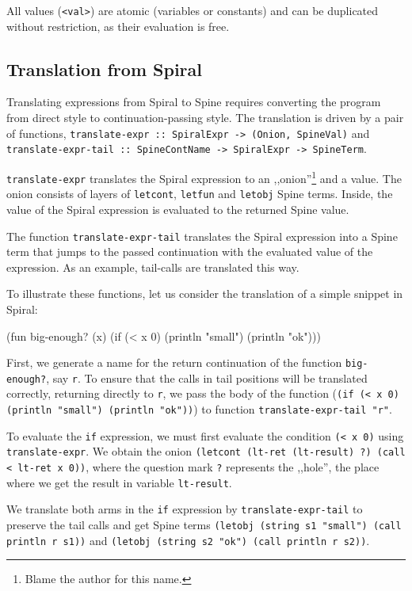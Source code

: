 All values (\texttt{<val>}) are atomic (variables or constants) and can be
duplicated without restriction, as their evaluation is free.

\subsection{Translation from Spiral}

Translating expressions from Spiral to Spine requires converting the program
from direct style to continuation-passing style. The translation is driven by a
pair of functions, \texttt{translate-expr :: SpiralExpr -> (Onion, SpineVal)}
and \texttt{translate-expr-tail :: SpineContName -> SpiralExpr -> SpineTerm}.

\texttt{translate-expr} translates the Spiral expression to an
,,onion''\footnote{Blame the author for this name.} and a value.
The onion consists of layers of \texttt{letcont}, \texttt{letfun} and
\texttt{letobj} Spine terms. Inside, the value of the Spiral expression is
evaluated to the returned Spine value.

The function \texttt{translate-expr-tail} translates the Spiral expression
into a Spine term that jumps to the passed continuation with the evaluated value
of the expression. As an example, tail-calls are translated this way.

To illustrate these functions, let us consider the translation of a simple snippet
in Spiral:

\begin{spiral}
(fun big-enough? (x)
  (if (< x 0)
    (println "small")
    (println "ok")))
\end{spiral}

First, we generate a name for the return continuation of the function
\texttt{big-enough?}, say \texttt{r}. To ensure that the calls in tail positions
will be translated correctly, returning directly to \texttt{r}, we pass the body
of the function (\texttt{(if (< x 0) (println "small") (println "ok"))}) to function
\texttt{translate-expr-tail "r"}.

To evaluate the \texttt{if} expression, we must first evaluate the condition
\texttt{(< x 0)} using \texttt{translate-expr}. We obtain the onion
\texttt{(letcont (lt-ret (lt-result) ?) (call < lt-ret x 0))}, where the
question mark \texttt{?} represents the ,,hole'', the place where we
get the result in variable \texttt{lt-result}.

We translate both arms in the \texttt{if} expression by
\texttt{translate-expr-tail} to preserve the tail calls and get Spine terms
\texttt{(letobj (string s1 "small") (call println r s1))} and \texttt{(letobj
(string s2 "ok") (call println r s2))}.

